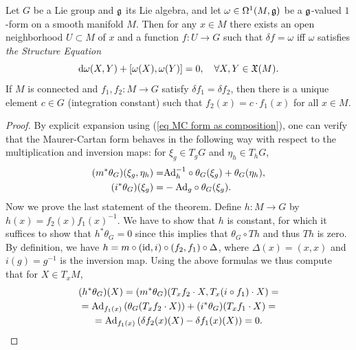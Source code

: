 \begin{thm}\label{thm 6.1 Sharpe fundamental local}
    Let $G$ be a Lie group and $\mathfrak{g}$ its Lie algebra, and let $\omega\in\Omega^1(M,\mathfrak{g})$ be a $\mathfrak{g}$-valued $1$-form on a smooth manifold $M$. Then for any $x\in M$ there exists an open neighborhood $U\subset M$ of $x$ and a function $f:U\to G$ such that $\delta f=\omega$ iff $\omega$ satisfies \emph{the Structure Equation}
    \[{\mathrm{d}} \omega(X,Y)+[\omega(X),\omega(Y)]=0,\quad \forall X,Y\in\mathfrak{X}(M).\]
    If $M$ is connected and $f_1,f_2:M\to G$ satisfy $\delta f_1=\delta f_2$, then there is a unique element $c\in G$ (integration constant) such that $f_2(x)=c\cdot f_1(x)$ for all $x\in M$.
\end{thm}
\begin{proof}
    By explicit expansion using (\ref{eq MC form as composition}), one can verify that the Maurer-Cartan form behaves in the following way with respect to the multiplication and inversion maps: for $\xi_g\in T_g G$ and $\eta_h\in T_hG$,
    \begin{align}
       ( m^\ast\theta_G)(\xi_g,\eta_h)=&\mathrm{Ad}_{h}^{-1}\circ \theta_G(\xi_g)+\theta_G(\eta_h),   \label{eq MC form under m}  \\
       (i^\ast\theta_G)(\xi_g)=&-\mathrm{Ad}_g\circ\theta_G(\xi_g). \label{eq MC form under i}
    \end{align}
    Now we prove the last statement of the theorem. Define $h:M\to G$ by $h(x)=f_2(x)f_1(x)^{-1}$. We have to show that $h$ is constant, for which it suffices to show that $h^\ast\theta_G=0$ since this implies that $\theta_G\circ Th$ and thus $Th$ is zero. By definition, we have $h=m\circ (\operatorname{id},i)\circ(f_2,f_1)\circ \Delta$, where $\Delta(x)=(x,x)$ and $i(g)=g^{-1}$ is the inversion map. Using the above formulas we thus compute that for $X\in T_xM$,
    \begin{multline}
        (h^\ast\theta_G)(X)=(m^\ast \theta_G)(T_x f_2\cdot X,T_x(i\circ f_1)\cdot X)=\\
        =\mathrm{Ad}_{f_1(x)}\left(\theta_G(T_xf_2\cdot X)\right)+(i^\ast\theta_G)(T_xf_1\cdot X)=\\
        =\mathrm{Ad}_{f_1(x)}\left(\delta f_2(x)(X)-\delta f_1(x)(X)\right)=0.
    \end{multline}

\end{proof}
